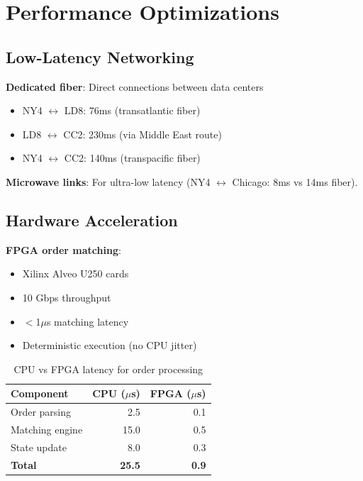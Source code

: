 \section{Performance Optimizations}


\subsection{Low-Latency Networking}

\textbf{Dedicated fiber}: Direct connections between data centers
\begin{itemize}
    \item NY4 $\leftrightarrow$ LD8: 76ms (transatlantic fiber)
    \item LD8 $\leftrightarrow$ CC2: 230ms (via Middle East route)
    \item NY4 $\leftrightarrow$ CC2: 140ms (transpacific fiber)
\end{itemize}

\textbf{Microwave links}: For ultra-low latency (NY4 $\leftrightarrow$ Chicago: 8ms vs 14ms fiber).

\subsection{Hardware Acceleration}

\textbf{FPGA order matching}:
\begin{itemize}
    \item Xilinx Alveo U250 cards
    \item 10 Gbps throughput
    \item $<$1$\mu$s matching latency
    \item Deterministic execution (no CPU jitter)
\end{itemize}

\begin{table}[h]
\centering
\begin{tabular}{lrr}
\toprule
\textbf{Component} & \textbf{CPU ($\mu$s)} & \textbf{FPGA ($\mu$s)} \\
\midrule
Order parsing & 2.5 & 0.1 \\
Matching engine & 15.0 & 0.5 \\
State update & 8.0 & 0.3 \\
\textbf{Total} & \textbf{25.5} & \textbf{0.9} \\
\bottomrule
\end{tabular}
\caption{CPU vs FPGA latency for order processing}
\end{table}

